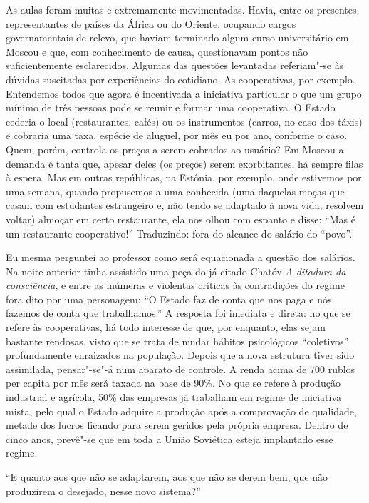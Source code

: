 As aulas foram muitas e extremamente movimentadas. Havia, entre os
presentes, representantes de países da África ou do Oriente, ocupando
cargos governamentais de relevo, que haviam terminado algum curso
universitário em Moscou e que, com conhecimento de causa, questionavam
pontos não suficientemente esclarecidos. Algumas das questões levantadas
referiam"-se às dúvidas suscitadas por experiências do cotidiano. As
cooperativas, por exemplo. Entendemos todos que agora é incentivada a
iniciativa particular o que um grupo mínimo de três pessoas pode se
reunir e formar uma cooperativa. O Estado cederia o local (restaurantes,
cafés) ou os instrumentos (carros, no caso dos táxis) e cobraria uma
taxa, espécie de aluguel, por mês eu por ano, conforme o caso. Quem,
porém, controla os preços a serem cobrados ao usuário? Em Moscou a
demanda é tanta que, apesar deles (os preços) serem exorbitantes, há
sempre filas à espera. Mas em outras repúblicas, na Estônia, por
exemplo, onde estivemos por uma semana, quando propusemos a uma
conhecida (uma daquelas moças que casam com estudantes estrangeiro e,
não tendo se adaptado à nova vida, resolvem voltar) almoçar em certo
restaurante, ela nos olhou com espanto e disse: ``Mas é um restaurante
cooperativo!'' Traduzindo: fora do alcance do salário do ``povo''.

Eu mesma perguntei ao professor como será equacionada a questão dos
salários. Na noite anterior tinha assistido uma peça do já citado Chatóv
\emph{A ditadura da consciência}, e entre as inúmeras e violentas
críticas às contradições do regime fora dito por uma personagem: ``O
Estado faz de conta que nos paga e nós fazemos de conta que
trabalhamos.'' A resposta foi imediata e direta: no que se refere às
cooperativas, há todo interesse de que, por enquanto, elas sejam
bastante rendosas, visto que se trata de mudar hábitos psicológicos
``coletivos'' profundamente enraizados na população. Depois que a nova
estrutura tiver sido assimilada, pensar"-se"-á num aparato de controle. A
renda acima de 700 rublos per capita por mês será taxada na base de
90\%. No que se refere à produção industrial e agrícola, 50\% das
empresas já trabalham em regime de iniciativa mista, pelo qual o Estado
adquire a produção após a comprovação de qualidade, metade dos lucros
ficando para serem geridos pela própria empresa. Dentro de cinco anos,
prevê"-se que em toda a União Soviética esteja implantado esse regime.

``E quanto aos que não se adaptarem, aos que não se derem bem, que não
produzirem o desejado, nesse novo sistema?''

